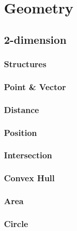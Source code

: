 \section{Geometry}

\subsection{2-dimension}
\subsubsection{Structures}


\subsubsection{Point \& Vector}


\subsubsection{Distance}


\subsubsection{Position}


\subsubsection{Intersection}


\subsubsection{Convex Hull}


\subsubsection{Area}


\subsubsection{Circle}


